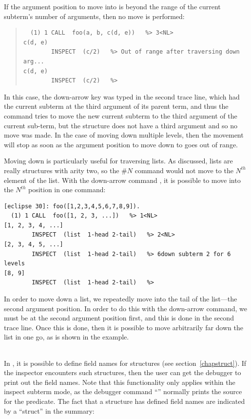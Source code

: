 \begin{descr}{1cm}
If the argument position to move into is beyond the range of the current
subterm's number of arguments, then no move is performed:

\begin{quote}
\begin{verbatim}
  (1) 1 CALL  foo(a, b, c(d, e))   %> 3<NL>
c(d, e)
        INSPECT  (c/2)   %> Out of range after traversing down arg...
c(d, e)
        INSPECT  (c/2)   %>
\end{verbatim}
\end{quote}
In this case, the down-arrow key was typed in the second trace line, which
had the current subterm at the third argument of its parent term, and thus
the command tries to move the new current subterm to the third argument of
the current sub-term, but the structure does not have a third argument and
so no move was made. In the case of moving down multiple levels, then the
movement will stop as soon as the argument position to move down to goes
out of range.

Moving down is particularly useful for traversing lists. As discussed,
lists are really structures with arity two, so the $\#N$ command would
not move to the $N^{th}$ element of the list. With the down-arrow command ,
it is possible to move into the $N^{th}$ position in one command:

\begin{verbatim}
[eclipse 30]: foo([1,2,3,4,5,6,7,8,9]).
  (1) 1 CALL  foo([1, 2, 3, ...])   %> 1<NL>
[1, 2, 3, 4, ...]
        INSPECT  (list  1-head 2-tail)   %> 2<NL>
[2, 3, 4, 5, ...]
        INSPECT  (list  1-head 2-tail)   %> 6down subterm 2 for 6 levels
[8, 9]
        INSPECT  (list  1-head 2-tail)   %>
\end{verbatim}

In order to move down a list, we repeatedly move into the tail of the
list---the second argument position. In order to do this with the down-arrow
command, we must be at the second argument position first, and this is
done in the second trace line. Once this is done, then it is possible to
move arbitrarily far down the list in one go, as is shown in the example.

\\
In \eclipse, it is possible to define field names for structures (see
section~\ref{chapstruct}). If the inspector encounters such structures,
then the user can get the debugger to print out the field names. Note that
this functionality only applies within the inspect subterm mode, as the
debugger command ``'' normally prints the source for the predicate.
The fact that a structure has defined field names are indicated by a
``struct'' in the summary:


\end{descr}
